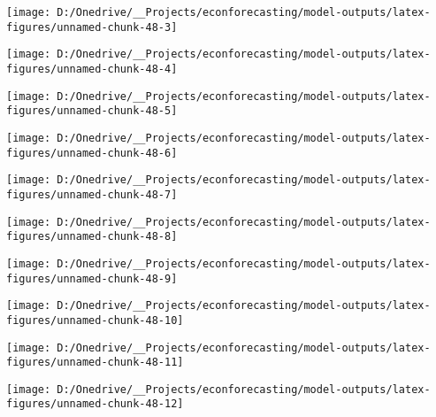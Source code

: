 \documentclass[11pt, letterpaper]{article}\usepackage[]{graphicx}\usepackage[]{color}
\begin{document}
{\centering \texttt{[image: D:/Onedrive/\_\_Projects/econforecasting/model-outputs/latex-figures/unnamed-chunk-48-3]} 

}




{\centering \texttt{[image: D:/Onedrive/\_\_Projects/econforecasting/model-outputs/latex-figures/unnamed-chunk-48-4]} 

}




{\centering \texttt{[image: D:/Onedrive/\_\_Projects/econforecasting/model-outputs/latex-figures/unnamed-chunk-48-5]} 

}




{\centering \texttt{[image: D:/Onedrive/\_\_Projects/econforecasting/model-outputs/latex-figures/unnamed-chunk-48-6]} 

}




{\centering \texttt{[image: D:/Onedrive/\_\_Projects/econforecasting/model-outputs/latex-figures/unnamed-chunk-48-7]} 

}




{\centering \texttt{[image: D:/Onedrive/\_\_Projects/econforecasting/model-outputs/latex-figures/unnamed-chunk-48-8]} 

}




{\centering \texttt{[image: D:/Onedrive/\_\_Projects/econforecasting/model-outputs/latex-figures/unnamed-chunk-48-9]} 

}




{\centering \texttt{[image: D:/Onedrive/\_\_Projects/econforecasting/model-outputs/latex-figures/unnamed-chunk-48-10]} 

}




{\centering \texttt{[image: D:/Onedrive/\_\_Projects/econforecasting/model-outputs/latex-figures/unnamed-chunk-48-11]} 

}




{\centering \texttt{[image: D:/Onedrive/\_\_Projects/econforecasting/model-outputs/latex-figures/unnamed-chunk-48-12]} 

}
\end{document}
